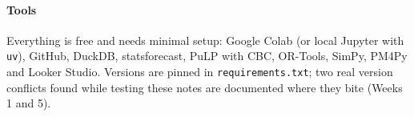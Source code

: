 \paragraph{Tools} Everything is free and needs minimal setup: Google Colab (or local Jupyter with \texttt{uv}),
GitHub, DuckDB, statsforecast, PuLP with CBC, OR-Tools, SimPy, PM4Py and Looker Studio. Versions are pinned in
\texttt{requirements.txt}; two real version conflicts found while testing these notes are documented where they
bite (Weeks 1 and 5).
